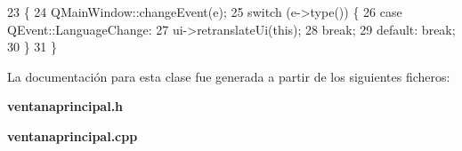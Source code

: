 \begin{DoxyCode}
23                                            \{
24     QMainWindow::changeEvent(e);
25     \textcolor{keywordflow}{switch} (e->type()) \{
26     \textcolor{keywordflow}{case} QEvent::LanguageChange:
27         ui->retranslateUi(\textcolor{keyword}{this});
28         \textcolor{keywordflow}{break};
29     \textcolor{keywordflow}{default}:    \textcolor{keywordflow}{break};
30     \}
31 \}
\end{DoxyCode}


La documentación para esta clase fue generada a partir de los siguientes ficheros\-:\begin{DoxyCompactItemize}
\item 
{\bf ventanaprincipal.\-h}\item 
{\bf ventanaprincipal.\-cpp}\end{DoxyCompactItemize}

